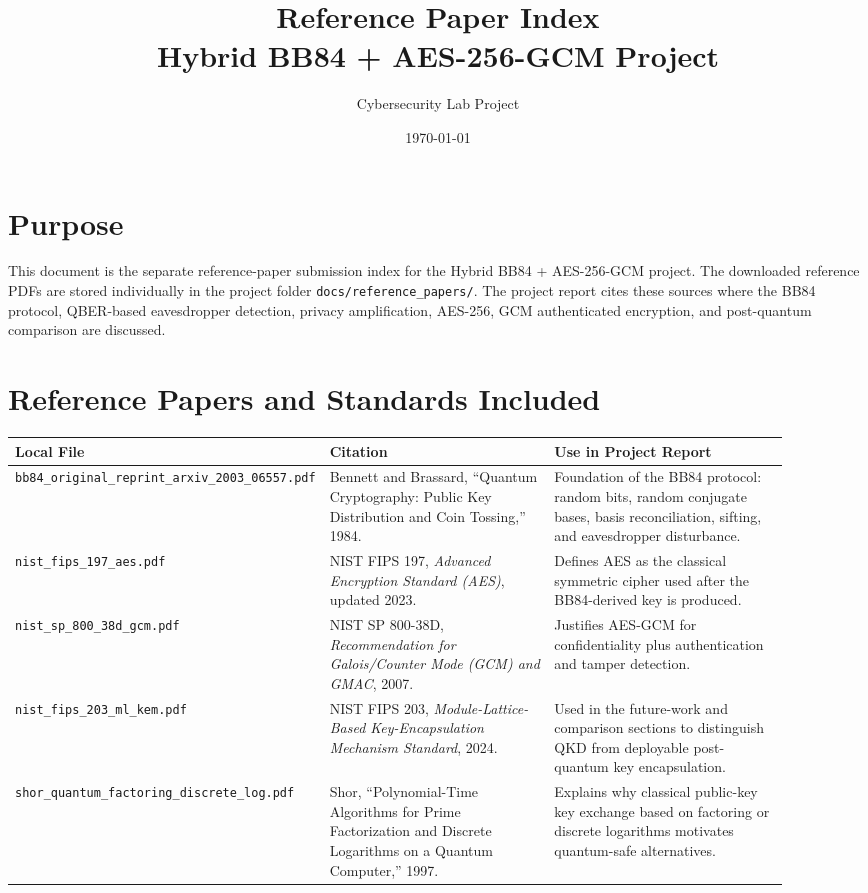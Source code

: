 \documentclass[11pt,a4paper]{article}
\title{Reference Paper Index\\Hybrid BB84 + AES-256-GCM Project}
\author{Cybersecurity Lab Project}
\date{\today}
\begin{document}
\maketitle

\section*{Purpose}
This document is the separate reference-paper submission index for the Hybrid BB84 + AES-256-GCM project. The downloaded reference PDFs are stored individually in the project folder \texttt{docs/reference\_papers/}. The project report cites these sources where the BB84 protocol, QBER-based eavesdropper detection, privacy amplification, AES-256, GCM authenticated encryption, and post-quantum comparison are discussed.

\section*{Reference Papers and Standards Included}
\begin{longtable}{p{0.24\linewidth}p{0.32\linewidth}p{0.34\linewidth}}
\toprule
\textbf{Local File} & \textbf{Citation} & \textbf{Use in Project Report} \\
\midrule
\endhead
\texttt{bb84\_original\_reprint\_arxiv\_2003\_06557.pdf} &
Bennett and Brassard, ``Quantum Cryptography: Public Key Distribution and Coin Tossing,'' 1984. &
Foundation of the BB84 protocol: random bits, random conjugate bases, basis reconciliation, sifting, and eavesdropper disturbance. \\
\addlinespace
\texttt{nist\_fips\_197\_aes.pdf} &
NIST FIPS 197, \emph{Advanced Encryption Standard (AES)}, updated 2023. &
Defines AES as the classical symmetric cipher used after the BB84-derived key is produced. \\
\addlinespace
\texttt{nist\_sp\_800\_38d\_gcm.pdf} &
NIST SP 800-38D, \emph{Recommendation for Galois/Counter Mode (GCM) and GMAC}, 2007. &
Justifies AES-GCM for confidentiality plus authentication and tamper detection. \\
\addlinespace
\texttt{nist\_fips\_203\_ml\_kem.pdf} &
NIST FIPS 203, \emph{Module-Lattice-Based Key-Encapsulation Mechanism Standard}, 2024. &
Used in the future-work and comparison sections to distinguish QKD from deployable post-quantum key encapsulation. \\
\addlinespace
\texttt{shor\_quantum\_factoring\_discrete\_log.pdf} &
Shor, ``Polynomial-Time Algorithms for Prime Factorization and Discrete Logarithms on a Quantum Computer,'' 1997. &
Explains why classical public-key key exchange based on factoring or discrete logarithms motivates quantum-safe alternatives. \\
\bottomrule
\end{longtable}
\end{document}
